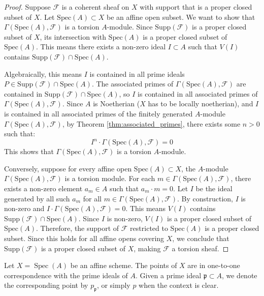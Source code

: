 \documentclass[12pt]{article}
\begin{document}
\begin{proof}
    Suppose $\mathcal{F}$ is a coherent sheaf on $X$ with support that is a proper closed subset of $X$. Let $\text{Spec}(A) \subset X$ be an affine open subset. We want to show that $\Gamma(\text{Spec}(A), \mathcal{F})$ is a torsion $A$-module. Since $\text{Supp}(\mathcal{F})$ is a proper closed subset of $X$, its intersection with $\text{Spec}(A)$ is a proper closed subset of $\text{Spec}(A)$. This means there exists a non-zero ideal $I \subset A$ such that $V(I)$ contains $\text{Supp}(\mathcal{F}) \cap \text{Spec}(A)$.

    Algebraically, this means $I$ is contained in all prime ideals $P \in \text{Supp}(\mathcal{F}) \cap \text{Spec}(A)$. The associated primes of $\Gamma(\text{Spec}(A), \mathcal{F})$ are contained in $\text{Supp}(\mathcal{F}) \cap \text{Spec}(A)$, so $I$ is contained in all associated primes of $\Gamma(\text{Spec}(A), \mathcal{F})$. Since $A$ is Noetherian ($X$ has to be locally noetherian), and $I$ is contained in all associated primes of the finitely generated $A$-module $\Gamma(\text{Spec}(A), \mathcal{F})$, by Theorem \ref{thm:associated_primes}, there exists some $n > 0$ such that:
    \[I^n \cdot \Gamma(\text{Spec}(A), \mathcal{F}) = 0\]
    This shows that $\Gamma(\text{Spec}(A), \mathcal{F})$ is a torsion $A$-module.


    Conversely, suppose for every affine open $\text{Spec}(A) \subset X$, the $A$-module $\Gamma(\text{Spec}(A), \mathcal{F})$ is a torsion module. For each $m \in \Gamma(\text{Spec}(A), \mathcal{F})$, there exists a non-zero element $a_m \in A$ such that $a_m \cdot m = 0$. Let $I$ be the ideal generated by all such $a_m$ for all $m \in \Gamma(\text{Spec}(A), \mathcal{F})$. By construction, $I$ is non-zero and $I \cdot \Gamma(\text{Spec}(A), \mathcal{F}) = 0$. This means $V(I)$ contains $\text{Supp}(\mathcal{F}) \cap \text{Spec}(A)$. Since $I$ is non-zero, $V(I)$ is a proper closed subset of $\text{Spec}(A)$. Therefore, the support of $\mathcal{F}$ restricted to $\text{Spec}(A)$ is a proper closed subset. Since this holds for all affine opens covering $X$, we conclude that $\text{Supp}(\mathcal{F})$ is a proper closed subset of $X$, making $\mathcal{F}$ a torsion sheaf.
\end{proof}


\begin{definition}
    Let $X = \operatorname{Spec}(A)$ be an affine scheme. The points of $X$ are in one-to-one correspondence with the prime ideals of $A$. Given a prime ideal $\mathfrak{p} \subset A$, we denote the corresponding point by $p_{\mathfrak{p}}$, or simply $p$ when the context is clear.
\end{definition}
\end{document}
